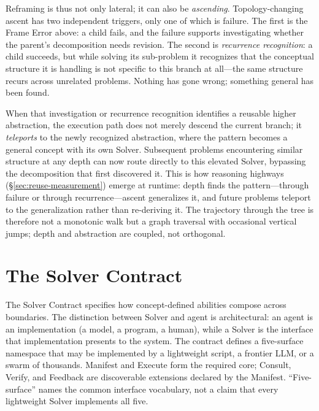 \documentclass[11pt]{article}
\begin{document}
Reframing is thus not only lateral; it can also be \emph{ascending}. Topology-changing ascent has two independent triggers, only one of which is failure. The first is the Frame Error above: a child fails, and the failure supports investigating whether the parent's decomposition needs revision. The second is \emph{recurrence recognition}: a child succeeds, but while solving its sub-problem it recognizes that the conceptual structure it is handling is not specific to this branch at all---the same structure recurs across unrelated problems. Nothing has gone wrong; something general has been found.

When that investigation or recurrence recognition identifies a reusable higher abstraction, the execution path does not merely descend the current branch; it \emph{teleports} to the newly recognized abstraction, where the pattern becomes a general concept with its own Solver. Subsequent problems encountering similar structure at any depth can now route directly to this elevated Solver, bypassing the decomposition that first discovered it. This is how reasoning highways (\S\ref{sec:reuse-measurement}) emerge at runtime: depth finds the pattern---through failure or through recurrence---ascent generalizes it, and future problems teleport to the generalization rather than re-deriving it. The trajectory through the tree is therefore not a monotonic walk but a graph traversal with occasional vertical jumps; depth and abstraction are coupled, not orthogonal.

\section{The Solver Contract}
\label{sec:contract}

The Solver Contract specifies how concept-defined abilities compose across boundaries. The distinction between Solver and agent is architectural: an agent is an implementation (a model, a program, a human), while a Solver is the interface that implementation presents to the system. The contract defines a five-surface namespace that may be implemented by a lightweight script, a frontier LLM, or a swarm of thousands. Manifest and Execute form the required core; Consult, Verify, and Feedback are discoverable extensions declared by the Manifest. ``Five-surface'' names the common interface vocabulary, not a claim that every lightweight Solver implements all five.
\end{document}
